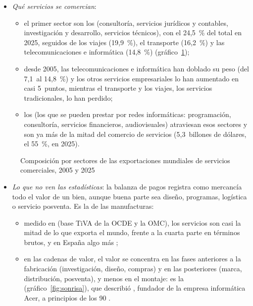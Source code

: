 \documentclass[11pt]{article}
\begin{document}
\begin{itemize}
\item \emph{Qué servicios se comercian}:
  \begin{itemize}
  \item el primer sector son los  (consultoría, servicios jurídicos y contables, investigación y desarrollo, servicios técnicos), con el 24,5~\% del total en 2025, seguidos de los viajes (19,9~\%), el transporte (16,2~\%) y las telecomunicaciones e informática (14,8~\%) (gráfico~\ref{fig:servicios-sectores})\nocite{OMC2026EstadisticasServicios};
  \item desde 2005, las telecomunicaciones e informática han doblado su peso (del 7,1~al 14,8~\%) y los otros servicios empresariales lo han aumentado en casi 5~puntos, mientras el transporte y los viajes, los servicios tradicionales, lo han perdido;
  \item los  (los que se pueden prestar por redes informáticas: programación, consultoría, servicios financieros, audiovisuales) atraviesan esos sectores y son ya más de la mitad del comercio de servicios (5,3~billones de dólares, el 55~\%, en 2025)\nocite{OMC2026EstadisticasServicios}.
  \end{itemize}
\end{itemize}

\begin{figure}[H]
\centering
\caption{Composición por sectores de las exportaciones mundiales de servicios comerciales, 2005 y 2025}\label{fig:servicios-sectores}
\end{figure}

\begin{itemize}
\item \emph{Lo que no ven las estadísticas}: la balanza de pagos registra como mercancía todo el valor de un bien, aunque buena parte sea diseño, programas, logística o servicio posventa. Es la  de las manufacturas:
  \begin{itemize}
  \item medido en  (base TiVA de la OCDE y la OMC), los servicios son casi la mitad de lo que exporta el mundo, frente a la cuarta parte en términos brutos, y en España algo más\nocite{OCDE2025TiVA} ;
  \item en las cadenas de valor, el valor se concentra en las fases anteriores a la fabricación (investigación, diseño, compras) y en las posteriores (marca, distribución, posventa), y menos en el montaje: es la  (gráfico~\ref{fig:sonrisa}), que describió , fundador de la empresa informática Acer, a principios de los 90 .
  \end{itemize}
\end{itemize}
\end{document}
